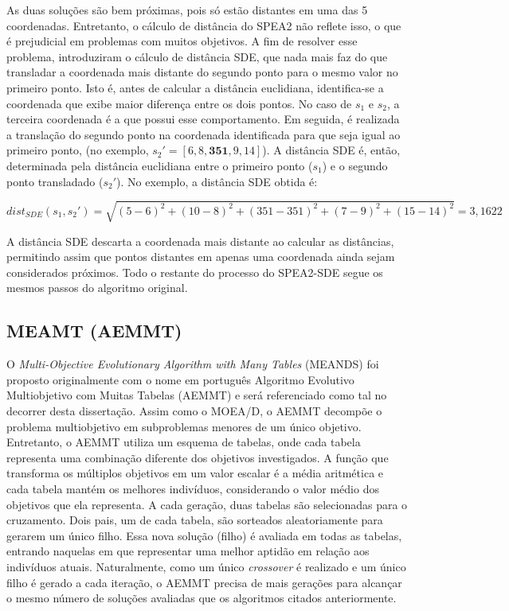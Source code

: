 As duas soluções são bem próximas, pois só estão distantes em uma das 5 coordenadas. Entretanto, o cálculo de distância do SPEA2 não reflete isso, o que é prejudicial em problemas com muitos objetivos. A fim de resolver esse problema, \cite{Spea2SDE} introduziram o cálculo de distância \ac{SDE}, que nada mais faz do que transladar a coordenada mais distante do segundo ponto para o mesmo valor no primeiro ponto. Isto é, antes de calcular a distância euclidiana, identifica-se a coordenada que exibe maior diferença entre os dois pontos. No caso de $s_1$ e $s_2$, a terceira coordenada é a que possui esse comportamento. Em seguida, é realizada a translação do segundo ponto na coordenada identificada para que seja igual ao primeiro ponto, (no exemplo, $s_2' = [6, 8, \textbf{351}, 9, 14]$). A distância SDE é, então, determinada pela distância euclidiana entre o primeiro ponto ($s_1$) e o segundo ponto transladado ($s_2'$). No exemplo, a distância SDE obtida é: 

\begin{equation}dist_{SDE}(s_1, s_2') = \sqrt{(5-6)^2 + (10-8)^2 + (351-351)^2 + (7-9)^2 + (15-14)^2} = 3,1622\end{equation}

A distância SDE descarta a coordenada mais distante ao calcular as distâncias, permitindo assim que pontos distantes em apenas uma coordenada ainda sejam considerados próximos. Todo o restante do processo do SPEA2-SDE segue os mesmos passos do algoritmo original.

\subsection{MEAMT (AEMMT)}

O \textit{Multi-Objective Evolutionary Algorithm with Many Tables} (MEANDS) \cite{Brasil2013} foi proposto originalmente com o nome em português Algoritmo Evolutivo Multiobjetivo com Muitas Tabelas (AEMMT) e será referenciado como tal no decorrer desta dissertação. Assim como o MOEA/D, o AEMMT decompõe o problema multiobjetivo em subproblemas menores de um único objetivo. Entretanto, o AEMMT utiliza um esquema de tabelas, onde cada tabela representa uma combinação diferente dos objetivos investigados. A função que transforma os múltiplos objetivos em um valor escalar é a média aritmética e cada tabela mantém os melhores indivíduos, considerando o valor médio dos objetivos que ela representa. A cada geração, duas tabelas são selecionadas para o cruzamento. Dois pais, um de cada tabela, são sorteados aleatoriamente para gerarem um único filho. Essa nova solução (filho) é avaliada em todas as tabelas, entrando naquelas em que representar uma melhor aptidão em relação aos indivíduos atuais. Naturalmente, como um único \textit{crossover} é realizado e um único filho é gerado a cada iteração, o AEMMT precisa de mais gerações para alcançar o mesmo número de soluções avaliadas que os algoritmos citados anteriormente.

